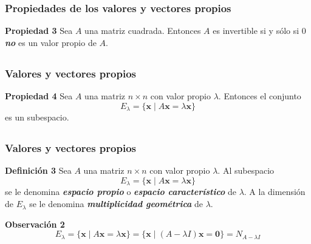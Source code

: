 \begin{frame}\frametitle{Propiedades de los valores y vectores propios}
	
	\begin{prop}{\textbf{Propiedad 3}}
		\justifying
		Sea $A$ una matriz cuadrada. Entonces $A$ es invertible si y sólo si $0$ \textit{\textbf{no}} es un valor propio de $A$.
	\end{prop}	
	
\end{frame}


\subsection{}

\begin{frame}\frametitle{Valores y vectores propios}
	
	\begin{prop}{\textbf{Propiedad 4}}
		\justifying
		Sea $A$ una matriz $n\times n$ con valor propio $\lambda$. Entonces el conjunto 
		\[
		E_{\lambda} = \{ \mathbf{x} \mid A\mathbf{x}=\lambda\mathbf{x} \}
		\]
		es un subespacio.
	\end{prop}		

	
\end{frame}


\subsection{}

\begin{frame}\frametitle{Valores y vectores propios}
		
	\begin{defi}{\textbf{Definición 3}}\justifying
		Sea $A$ una matriz $n\times n$ con valor propio $\lambda$. Al subespacio
		\[
		E_{\lambda} = \{ \mathbf{x} \mid A\mathbf{x}=\lambda\mathbf{x} \}
		\]
		se le denomina \textbf{\textit{espacio propio}} o \textbf{\textit{espacio característico}}
		de $\lambda$. A la dimensión de $E_{\lambda}$ se le denomina \textbf{\textit{multiplicidad geométrica}}
		de $\lambda$.
	\end{defi}	

	\begin{alertblock}{\textbf{Observación 2}}
		\[
			E_{\lambda} = \{ \mathbf{x} \mid A\mathbf{x}=\lambda\mathbf{x} \} 
			            = \{ \mathbf{x} \mid (A-\lambda I)\mathbf{x} = \mathbf{0} \}
			            = N_{A-\lambda I}
		\]
	\end{alertblock}
	
\end{frame}

